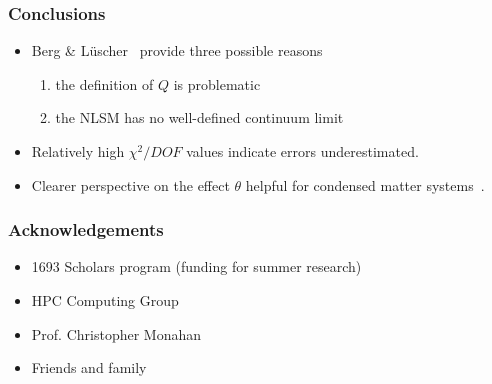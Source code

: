 \documentclass{beamer}
\begin{document}
\begin{frame}
    \frametitle{Conclusions}
    \begin{itemize}
        \item  Berg \& L\"uscher~ provide three possible reasons
            \begin{enumerate}
                \item the definition of $Q$ is problematic
                \item the NLSM has no well-defined continuum limit
            \end{enumerate}

        \item<3-> Relatively high $\chi^2/DOF$ values indicate errors underestimated.
        \item<4-> Clearer perspective on the effect $\theta$ helpful for condensed matter systems~.
    \end{itemize}
\end{frame}
\begin{frame}
    \frametitle{Acknowledgements}
    \begin{itemize}
        \item<1-> 1693 Scholars program (funding for summer research)
        \item<2-> HPC Computing Group
        \item<3-> Prof. Christopher Monahan
        \item<4-> Friends and family
    \end{itemize}
\end{frame}
\end{document}
